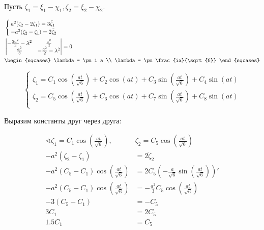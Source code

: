 Пусть \(\zeta_1 = \xi_1 - \chi_1, \zeta_2 = \xi_2 - \chi_2\).

\begin{align*}
     & \begin{cases}
        a^2(\zeta_2 - 2\zeta_1) = 3\ddot \zeta_1  \\
        - a^2(\zeta_2 - \zeta_1) = 2\ddot \zeta_2 \\
    \end{cases}     \\
     & \begin{vmatrix} - \frac{2a^2}{3} - \lambda^2 & \frac{a^2}{3} \\ \frac{a^2}{3} & - \frac{a^2}{2} - \lambda^2 \end{vmatrix} = 0 \\
     & \begin{sqcases} \lambda = \pm i a \\ \lambda = \pm \frac{ia}{\sqrt{6}} \end{sqcases}     \\
\end{align*}

\[\begin{cases}
        \zeta_1 = C_1 \cos\left( \frac{at}{\sqrt{6}} \right) + C_2\cos(at) + C_3 \sin\left( \frac{at}{\sqrt{6}} \right) + C_4 \sin(at) \\
        \zeta_2 = C_5 \cos\left( \frac{at}{\sqrt{6}} \right) + C_6\cos(at) + C_7 \sin\left( \frac{at}{\sqrt{6}} \right) + C_8 \sin(at) \\
    \end{cases}\]

Выразим константы друг через друга:

\begin{align*}
    \sphericalangle \zeta_1 = C_1\cos\left( \frac{at}{\sqrt{6}} \right), & \zeta_2 = C_5 \cos\left( \frac{at}{\sqrt{6}} \right)                              \\
    - a^2(\zeta_2 - \zeta_1)                                             & = 2 \ddot \zeta_2                                                                 \\
    - a^2(C_5 - C_1)\cos\left( \frac{at}{\sqrt{6}} \right)               & = 2 C_5\left( - \frac{a}{\sqrt{6}}\sin \left( \frac{at}{\sqrt{6}} \right)\right)' \\
    - a^2(C_5 - C_1)\cos\left( \frac{at}{\sqrt{6}} \right)               & = -\frac{a^2}{3}C_5\cos \left( \frac{at}{\sqrt{6}} \right)                        \\
    - 3(C_5 - C_1)                                                       & = -C_5                                                                            \\
    3C_1                                                                 & = 2C_5                                                                            \\
    1.5C_1                                                               & = C_5                                                                             \\
\end{align*}

